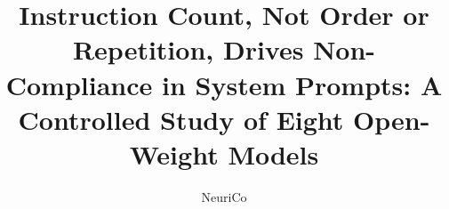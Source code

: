 \documentclass{article}
\title{Instruction Count, Not Order or Repetition, Drives Non-Compliance in System Prompts: A Controlled Study of Eight Open-Weight Models}
\author{NeuriCo}
\begin{document}
\maketitle

\begin{abstract}

\end{abstract}









\end{document}
